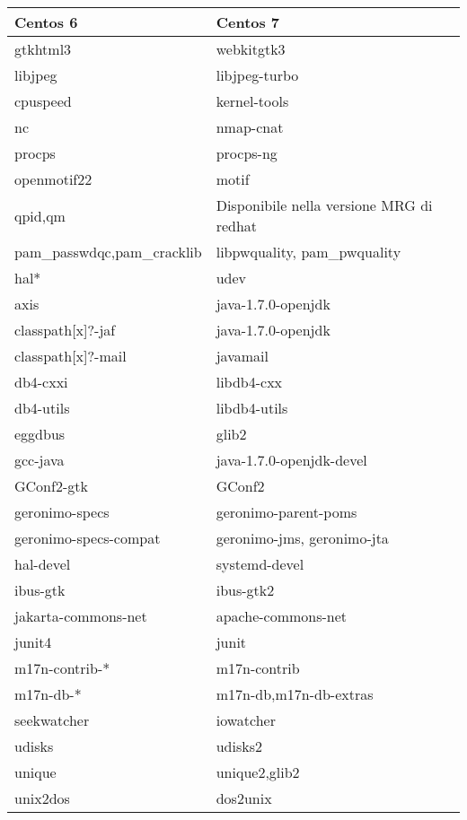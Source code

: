 \documentclass[11pt]{article}
\begin{document}
\begin{center}
	\renewcommand{\arraystretch}{1.5}
	\begin{tabular}{|l|l|}
		\hline
		\rowcolor{hgray}
		\textbf{Centos 6} & \textbf{Centos 7} \\
		\hline
		gtkhtml3 & webkitgtk3 \\ \hline
		libjpeg & libjpeg-turbo \\ \hline
		cpuspeed & kernel-tools \\ \hline
		nc & nmap-cnat \\ \hline
		procps & procps-ng \\ \hline
		openmotif22 & motif \\ \hline
		qpid,qm & Disponibile nella versione MRG di redhat \\ \hline
		pam\_passwdqc,pam\_cracklib & libpwquality, pam\_pwquality \\ \hline
		hal* & udev \\ \hline
		axis & java-1.7.0-openjdk \\ \hline
		classpath[x]?-jaf & java-1.7.0-openjdk \\ \hline
		classpath[x]?-mail & javamail \\ \hline
		db4-cxxi & libdb4-cxx \\ \hline
		db4-utils & libdb4-utils \\ \hline
		eggdbus & glib2 \\ \hline
		gcc-java & java-1.7.0-openjdk-devel \\ \hline
		GConf2-gtk & GConf2 \\ \hline
		geronimo-specs & geronimo-parent-poms \\ \hline
		geronimo-specs-compat & geronimo-jms, geronimo-jta \\ \hline
		hal-devel & systemd-devel \\ \hline
		ibus-gtk & ibus-gtk2 \\ \hline
		jakarta-commons-net & apache-commons-net \\ \hline
		junit4 & junit \\ \hline
		m17n-contrib-* & m17n-contrib \\ \hline
		m17n-db-* & m17n-db,m17n-db-extras \\ \hline
		seekwatcher & iowatcher \\ \hline
		udisks & udisks2 \\ \hline
		unique & unique2,glib2 \\ \hline
		unix2dos & dos2unix \\ \hline
	\end{tabular}
\end{center}
\end{document}
